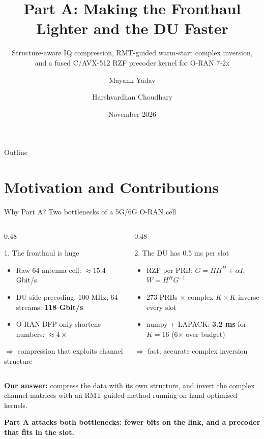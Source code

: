 \documentclass[aspectratio=169,11pt,xcolor=table]{beamer}
\title[Part A: Lighter Fronthaul, Faster DU]{Part A: Making the Fronthaul Lighter and the DU Faster}
\subtitle{Structure-aware IQ compression, RMT-guided warm-start complex inversion,\\
and a fused C/AVX-512 RZF precoder kernel for O-RAN 7-2x}
\author[M.~Yadav \& H.~Choudhary]{Mayank Yadav \and Harshvardhan Choudhary}
\institute[B.Tech. Project]{B.Tech. Project --- Final Evaluation}
\date{November 2026}
\newcommand{\hl}[1]{\textcolor{accent}{\textbf{#1}}}
\newcommand{\takeaway}[1]{%
  \vfill
  \begin{alertblock}{}\centering\textbf{#1}\end{alertblock}}
\begin{document}
\begin{frame}
  \titlepage
\end{frame}

\begin{frame}{Outline}
  \tableofcontents[hideallsubsections]
\end{frame}

\section{Motivation and Contributions}

\begin{frame}{Why Part A? Two bottlenecks of a 5G/6G O-RAN cell}
  \begin{columns}[T]
    \begin{column}{0.48\textwidth}
      \begin{block}{1. The fronthaul is huge}
        \begin{itemize}
          \item Raw 64-antenna cell: $\approx 15.4$ Gbit/s
          \item DU-side precoding, 100 MHz, 64 streams: \hl{118 Gbit/s}
          \item O-RAN BFP only shortens numbers: $\approx 4\times$
        \end{itemize}
        $\Rightarrow$ compression that exploits channel structure
      \end{block}
    \end{column}
    \begin{column}{0.48\textwidth}
      \begin{block}{2. The DU has 0.5 ms per slot}
        \begin{itemize}
          \item RZF per PRB: $G = HH^H + \alpha I$, \; $W = H^H G^{-1}$
          \item 273 PRBs $\times$ complex $K\times K$ inverse every slot
          \item numpy + LAPACK: \hl{3.2 ms} for $K=16$ (6$\times$ over budget)
        \end{itemize}
        $\Rightarrow$ fast, accurate complex inversion
      \end{block}
    \end{column}
  \end{columns}
  \vspace{4mm}
  \centering
  \textbf{Our answer:} compress the data with its own structure, and invert the complex
  channel matrices with an RMT-guided method running on hand-optimised kernels.
  \takeaway{Part A attacks both bottlenecks: fewer bits on the link, and a precoder that fits in the slot.}
\end{frame}
\end{document}

